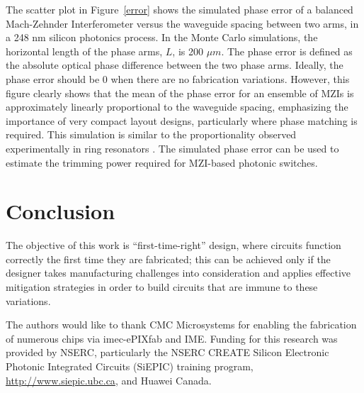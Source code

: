 \documentclass[journal]{spie}
\begin{document}
The scatter plot in Figure~\ref{error} shows the simulated phase error of a balanced Mach-Zehnder Interferometer versus the waveguide spacing between two arms, in a 248 nm silicon photonics process. In the Monte Carlo simulations, the horizontal length of the phase arms, $L$,  is 200 $\mu m$. The phase error is defined as the absolute optical phase difference between the two phase arms. Ideally, the phase error should be 0 when there are no fabrication variations. However, this figure clearly shows that the mean of the phase error for an ensemble of MZIs is approximately linearly proportional to the waveguide spacing, emphasizing the importance of very compact layout designs, particularly where phase matching is required.  This simulation is similar to the proportionality  observed experimentally in ring resonators \cite{lukas14:OFC}.  The simulated phase error can be used to estimate the trimming power required for MZI-based photonic switches. 



\section{Conclusion}\label{sec6}

%
%


The  objective of this work is ``first-time-right'' design, where circuits function correctly the first time they are fabricated; this can be achieved only if the designer takes manufacturing challenges into consideration and applies effective mitigation strategies in order to build circuits that are immune to these variations.



\acknowledgments

The authors would like to thank CMC Microsystems for enabling the fabrication of numerous chips via imec-ePIXfab and IME.  Funding for this research was provided by NSERC, particularly the NSERC CREATE Silicon Electronic Photonic Integrated Circuits (SiEPIC) training program, \url{http://www.siepic.ubc.ca}, and Huawei Canada.



\end{document}

